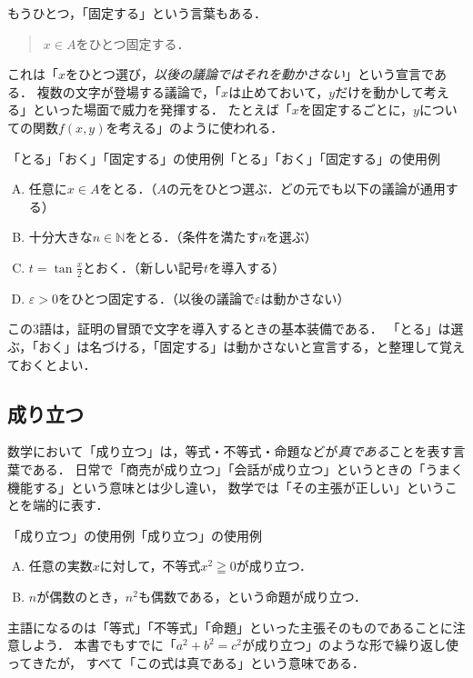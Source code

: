 もうひとつ，「固定する」という言葉もある．
\begin{quote}
  $x \in A$をひとつ固定する．
\end{quote}
これは「$x$をひとつ選び，\emph{以後の議論ではそれを動かさない}」という宣言である．
複数の文字が登場する議論で，「$x$は止めておいて，$y$だけを動かして考える」といった場面で威力を発揮する．
たとえば「$x$を固定するごとに，$y$についての関数$f(x,y)$を考える」のように使われる．

\begin{example}{「とる」「おく」「固定する」の使用例}{「とる」「おく」「固定する」の使用例}
  \begin{enumerate}[(A)]
    \item 任意に$x \in A$をとる．（$A$の元をひとつ選ぶ．どの元でも以下の議論が通用する）
    \item 十分大きな$n \in \mathbb{N}$をとる．（条件を満たす$n$を選ぶ）
    \item $t = \tan \frac{x}{2}$とおく．（新しい記号$t$を導入する）
    \item $\varepsilon > 0$をひとつ固定する．（以後の議論で$\varepsilon$は動かさない）
  \end{enumerate}
\end{example}

この3語は，証明の冒頭で文字を導入するときの基本装備である．
「とる」は選ぶ，「おく」は名づける，「固定する」は動かさないと宣言する，と整理して覚えておくとよい．

\subsection{成り立つ}

数学において「成り立つ」は，等式・不等式・命題などが\emph{真である}ことを表す言葉である．
日常で「商売が成り立つ」「会話が成り立つ」というときの「うまく機能する」という意味とは少し違い，
数学では「その主張が正しい」ということを端的に表す．

\begin{example}{「成り立つ」の使用例}{「成り立つ」の使用例}
  \begin{enumerate}[(A)]
    \item 任意の実数$x$に対して，不等式$x^2 \geqq 0$が成り立つ．
    \item $n$が偶数のとき，$n^2$も偶数である，という命題が成り立つ．
  \end{enumerate}
\end{example}

主語になるのは「等式」「不等式」「命題」といった主張そのものであることに注意しよう．
本書でもすでに「$a^2+b^2=c^2$が成り立つ」のような形で繰り返し使ってきたが，
すべて「この式は真である」という意味である．

